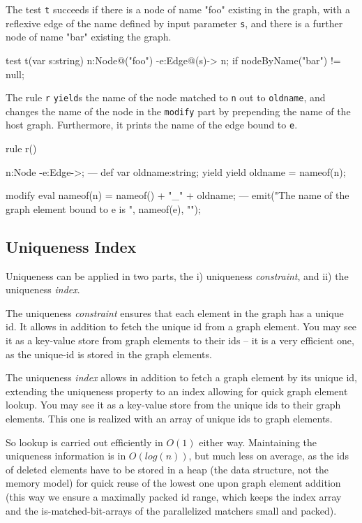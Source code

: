 \begin{example}
The test \texttt{t} succeeds if there is a node of name "foo" existing in the graph, with a reflexive edge of the name defined by input parameter \texttt{s}, and there is a further node of name "bar" existing the graph.

\begin{grgen}
test t(var s:string) {
  n:Node{@("foo")} -e:Edge{@(s)}-> n;
  if{ nodeByName("bar") != null; }
}
\end{grgen}

The rule \texttt{r} \texttt{yield}s the name of the node matched to \texttt{n} out to \texttt{oldname}, and changes the name of the node in the \texttt{modify} part by prepending the name of the host graph. Furthermore, it prints the name of the edge bound to \texttt{e}.

\begin{grgen}
rule r() {
  n:Node -e:Edge->;
---
  def var oldname:string;
  yield { yield oldname = nameof(n); }
		
  modify {
    eval {
      nameof(n) = nameof() + "_" + oldname;
    }
  ---
    emit("The name of the graph element bound to e is ", nameof(e), "\n");
  }
}
\end{grgen}

\end{example}


\subsection{Uniqueness Index}\label{sec:uniqueness}
Uniqueness can be applied in two parts, the i) uniqueness \emph{constraint}, and ii) the uniqueness \emph{index}.

The uniqueness \emph{constraint} ensures that each element in the graph has a unique id. 
It allows in addition to fetch the unique id from a graph element.
You may see it as a key-value store from graph elements to their ids -- it is a very efficient one, as the unique-id is stored in the graph elements. 

The uniqueness \emph{index} allows in addition to fetch a graph element by its unique id, extending the uniqueness property to an index allowing for quick graph element lookup.
You may see it as a key-value store from the unique ids to their graph elements.
This one is realized with an array of unique ids to graph elements.

So lookup is carried out efficiently in $O(1)$ either way.
Maintaining the uniqueness information is in $O(log(n))$, but much less on average, as the ids of deleted elements have to be stored in a heap (the data structure, not the memory model) for quick reuse of the lowest one upon graph element addition (this way we ensure a maximally packed id range, which keeps the index array and the is-matched-bit-arrays of the parallelized matchers small and packed).

